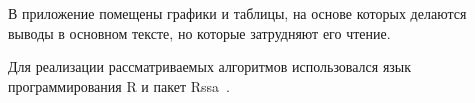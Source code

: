 \documentclass[specialist,
substylefile = spbu_report.rtx,
subf,href,colorlinks=true, 12pt]{disser}
\theoremstyle{definition}
\begin{document}

В приложение помещены графики и таблицы, на основе которых делаются выводы в основном тексте, но которые затрудняют его чтение.

Для реализации рассматриваемых алгоритмов использовался язык программирования \textsf{R} и пакет \textsf{Rssa}~\cite{Rssa}.



\end{document}
